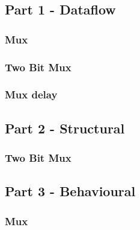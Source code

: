 \documentclass[11pt]{article}
\begin{document}
\begin{preview}
\subsection*{Part 1 - Dataflow}
\subsubsection*{Mux}
\begin{center}
  \fbox{}
  \vspace*{32px}
\end{center}

\subsubsection*{Two Bit Mux}
\begin{center}  
  \fbox{}
  \vspace*{32px}
\end{center}

\subsubsection*{Mux delay}
\begin{center}
  \fbox{}
  \vspace*{42px}
\end{center}

\subsection*{Part 2 - Structural}
\subsubsection*{Two Bit Mux}
\begin{center}  
  \fbox{}
  \vspace*{42px}
\end{center}

\subsection*{Part 3 - Behavioural}
\subsubsection*{Mux}
\begin{center}
  \fbox{}
  \vspace*{32px}
\end{center}


\end{preview}
\end{document}
